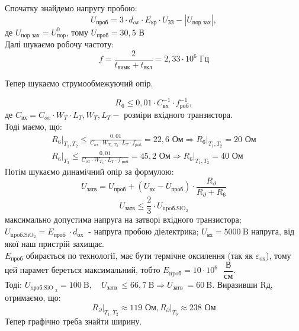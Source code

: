 \documentclass[a4paper,14pt]{extreport}
\begin{document}
	Спочатку знайдемо напругу пробою:
	\begin{equation}
	U_{\text{проб}} = 3 \cdot d_{ox} \cdot E_{\text{кр}} \cdot U_{\text{ЗЗ}} - |U_{\text{пор зах}} |, 
	\end{equation}
	де $U_{\text{пор зах}}  = U_{\text{пор}}^0$, тому $U_{\text{проб}} =  30,5 $ В\\

	Далі шукаємо робочу частоту:
	\begin{equation}
	f = \dfrac{2}{t_{\text{вимк}} + t_{\text{вкл}}} = 2,33 \cdot 10^{6} \text{ Гц}
	\end{equation}

	Тепер шукаємо струмообмежуючий опір.

	$$
	R_{6} \leq 0,01 \cdot C_{\text{вх}}^{-1} \cdot f_{\text{роб}}^{-1},
	$$
	де $C_{\text{вх}}=C_{ox} \cdot W_{T} \cdot L_{T}, W_{T}, L_{T}-$ розміри вхідного транзистора.\\
	Тоді маємо, що:
	$$
	\begin{array}{c}
	\left.R_{6}\right|_{T_{1}, T_{2}} \leq \frac{0,01}{C_{ox} \cdot W_{T_{1}, T_{2}} \cdot L_{T} \cdot f_{\text{роб}}}=22,\left.6 \text{ Ом} \Rightarrow R_{6}\right|_{T_{1}, T_{2}}=20 \text{ Ом} \\
	\left.R_{6}\right|_{T_{3}} \leq \frac{0,01}{C_{o x} \cdot W_{T_{3}} \cdot L_{T} \cdot f_{\text{ роб}}}=45,\left.2 \text{ Ом} \Rightarrow R_{6}\right|_{T_{1}, T_{2}}=40 \text{ Ом}
	\end{array}
	$$
	Потім шукаємо динамічний опір за формулою:
	$$
	U_{\text{затв}}=U_{\text{проб}}+\left(U_{\text{вх}}-U_{\text{проб}}\right) \cdot \frac{R_{\partial}}{R_{\partial}+R_{6}}
	$$
	$$
	U_{\text{затв}} \leq \frac{2}{3} \cdot U_{\text {npoб.SіO$_2$}}
	$$
	максимально допустима напруга на затворі вхідного
	транзистора; 
	$U_{\text{npoб.SіO$_2$}}=E_{\text {проб }} \cdot d_{\text {оx }}$ - напруга пробою діелектрика; $U_{\text {вх}}=5000 \mathrm{~B}$
	напруга, від якої наш пристрій захищає. \\
	$E_{\text{проб}}$ обирається по технології, має бути термічне оксилення
	(так як $\varepsilon_{\text{ox}}$), тому цей парамет береться максимальний, тобто $E_{\text{npoб}} = 10 \cdot 10^{6}\text{ } \dfrac{\text{В}}{\text{см}}$. \\


	Тоді: $U_{\text {nроб.SiO }_{2}}=100 \mathrm{~B}, \quad U_{\text {затв }} \leq 66,7 \mathrm{~B} \Rightarrow U_{\text {затв }}=60 \mathrm{~B}$. Виразивши Rд, отримаємо, що:
	$$
	\left.R_{\partial}\right|_{T_{1}, T_{2}} \approx 119  \text{ Ом},\left.R_{\partial}\right|_{T_{3}} \approx 238 \text{ Ом}
	$$
	Тепер графічно треба знайти ширину.
\end{document}
